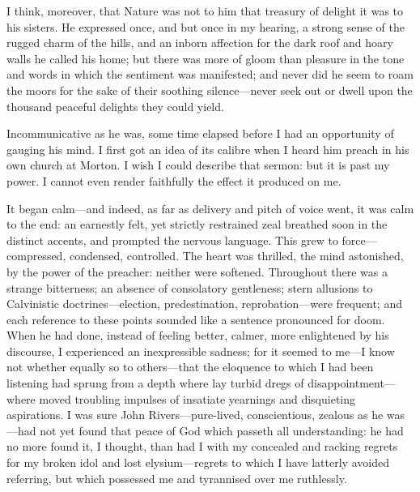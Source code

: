 I think, moreover, that Nature was not to him that treasury of delight
it was to his sisters. He expressed once, and but once in my hearing, a
strong sense of the rugged charm of the hills, and an inborn affection
for the dark roof and hoary walls he called his home; but there was more
of gloom than pleasure in the tone and words in which the sentiment was
manifested; and never did he seem to roam the moors for the sake of
their soothing silence---never seek out or dwell upon the thousand
peaceful delights they could yield.

Incommunicative as he was, some time elapsed before I had an opportunity
of gauging his mind. I first got an idea of its calibre when I heard
him preach in his own church at Morton. I wish I could describe that
sermon: but it is past my power. I cannot even render faithfully the
effect it produced on me.

It began calm---and indeed, as far as delivery and pitch of voice went,
it was calm to the end: an earnestly felt, yet strictly restrained zeal
breathed soon in the distinct accents, and prompted the nervous
language. This grew to force---compressed, condensed, controlled. The
heart was thrilled, the mind astonished, by the power of the preacher:
neither were softened. Throughout there was a strange bitterness; an
absence of consolatory gentleness; stern allusions to Calvinistic
doctrines---election, predestination, reprobation---were frequent; and
each reference to these points sounded like a sentence pronounced for
doom. When he had done, instead of feeling better, calmer, more
enlightened by his discourse, I experienced an inexpressible sadness;
for it seemed to me---I know not whether equally so to others---that the
eloquence to which I had been listening had sprung from a depth where
lay turbid dregs of disappointment---where moved troubling impulses of
insatiate yearnings and disquieting aspirations. I was sure \St{} John
Rivers---pure-lived, conscientious, zealous as he was---had not yet
found that peace of God which passeth all understanding: he had no more
found it, I thought, than had I with my concealed and racking regrets
for my broken idol and lost elysium---regrets to which I have latterly
avoided referring, but which possessed me and tyrannised over me
ruthlessly.

